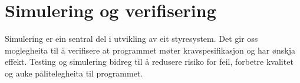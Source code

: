 \chapter{Simulering og verifisering}
\thispagestyle{fancy}

Simulering er ein sentral del i utvikling av eit styresystem.
Det gir oss moglegheita til å verifisere at programmet møter kravspesifikasjon og har ønskja effekt.
Testing og simulering bidreg til å redusere risiko for feil, forbetre kvalitet og auke pålitelegheita til programmet.


